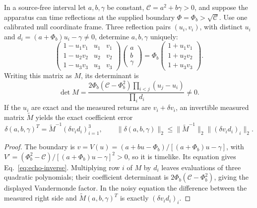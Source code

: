 \begin{proposition}\label{prop:echo}
In a source-free interval let $a,b,\gamma$ be constant, $\mathcal C=a^2+b\gamma>0$,
and suppose the apparatus can time reflections at the supplied boundary
$\Phi=\Phi_b>\sqrt{\mathcal C}$. Use one calibrated null coordinate frame.
Three reflection pairs $(u_i,v_i)$, with distinct $u_i$ and
$d_i=(a+\Phi_b)u_i-\gamma\ne0$, determine $a,b,\gamma$ uniquely:
\begin{equation}\label{eq:echo-inverse}
 \begin{pmatrix}
 1-u_1v_1&u_1&v_1\\
 1-u_2v_2&u_2&v_2\\
 1-u_3v_3&u_3&v_3
 \end{pmatrix}
 \begin{pmatrix}a\\b\\\gamma\end{pmatrix}
 =\Phi_b
 \begin{pmatrix}1+u_1v_1\\1+u_2v_2\\1+u_3v_3\end{pmatrix}.
\end{equation}
Writing this matrix as $M$, its determinant is
\[
 \det M=
 \frac{2\Phi_b(\mathcal C-\Phi_b^2)
       \prod_{i<j}(u_j-u_i)}{\prod_i d_i}\ne0.
\]
If the $u_i$ are exact and the measured returns are $v_i+\delta v_i$, an
invertible measured matrix $\widetilde M$ yields the exact coefficient error
\begin{equation}\label{eq:echo-error}
 \delta(a,b,\gamma)^T
 =\widetilde M^{-1}(\delta v_i d_i)_{i=1}^3,\qquad
 \|\delta(a,b,\gamma)\|_2
 \le\|\widetilde M^{-1}\|_2\|(\delta v_i d_i)_i\|_2.
\end{equation}
\end{proposition}
\begin{proof}
The boundary is
$v=V(u)=(a+bu-\Phi_b)/[(a+\Phi_b)u-\gamma]$,
with $V'=(\Phi_b^2-\mathcal C)/[(a+\Phi_b)u-\gamma]^2>0$, so it is timelike.
Its equation gives Eq.~\eqref{eq:echo-inverse}. Multiplying row $i$ of $M$ by
$d_i$ leaves evaluations of three quadratic polynomials; their coefficient
determinant is $2\Phi_b(\mathcal C-\Phi_b^2)$, giving the displayed Vandermonde
factor. In the noisy equation the difference between the measured right side
and $\widetilde M(a,b,\gamma)^T$ is exactly $(\delta v_i d_i)_i$.
\end{proof}

